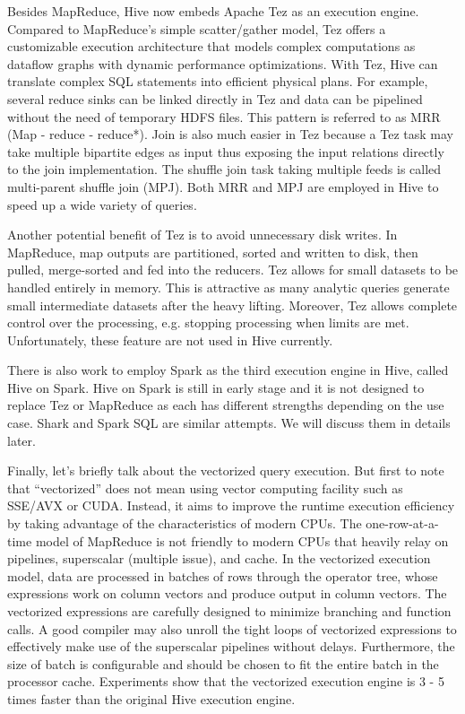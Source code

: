 \documentclass[11pt]{book}
\begin{document}
Besides MapReduce, Hive now embeds Apache Tez as an execution engine. Compared to MapReduce's simple scatter/gather model, Tez offers a customizable execution architecture that models complex computations as dataflow graphs with dynamic performance optimizations. With Tez, Hive can translate complex SQL statements into efficient physical plans. For example, several reduce sinks can be linked directly in Tez and data can be pipelined without the need of temporary HDFS files. This pattern is referred to as MRR (Map - reduce - reduce*). Join is also much easier in Tez because a Tez task may take multiple bipartite edges as input thus exposing the input relations directly to the join implementation. The shuffle join task taking multiple feeds is called multi-parent shuffle join (MPJ). Both MRR and MPJ are employed in Hive to speed up a wide variety of queries.

Another potential benefit of Tez is to avoid unnecessary disk writes. In MapReduce, map outputs are partitioned, sorted and written to disk, then pulled, merge-sorted and fed into the reducers. Tez allows for small datasets to be handled entirely in memory. This is attractive as many analytic queries generate small intermediate datasets after the heavy lifting. Moreover, Tez allows complete control over the processing, e.g. stopping processing when limits are met. Unfortunately, these feature are not used in Hive currently.

There is also work to employ Spark as the third execution engine in Hive, called Hive on Spark. Hive on Spark is still in early stage and it is not designed to replace Tez or MapReduce as each has different strengths depending on the use case. Shark and Spark SQL are similar attempts. We will discuss them in details later.

Finally, let's briefly talk about the vectorized query execution. But first to note that ``vectorized'' does not mean using vector computing facility such as SSE/AVX or CUDA. Instead, it aims to improve the runtime execution efficiency by taking advantage of the characteristics of modern CPUs. The one-row-at-a-time model of MapReduce is not friendly to modern CPUs that heavily relay on pipelines, superscalar (multiple issue), and cache. In the vectorized execution model, data are processed in batches of rows through the operator tree, whose expressions work on column vectors and produce output in column vectors. The vectorized expressions are carefully designed to minimize branching and function calls. A good compiler may also unroll the tight loops of vectorized expressions to effectively make use of the superscalar pipelines without delays. Furthermore, the size of batch is configurable and should be chosen to fit the entire batch in the processor cache. Experiments show that the vectorized execution engine is 3 - 5 times faster than the original Hive execution engine.
\end{document}

